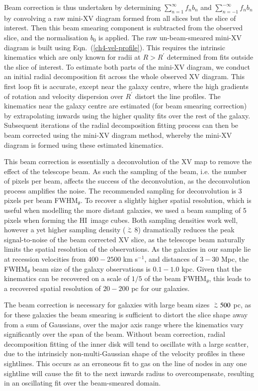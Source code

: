 \documentclass[traditabstract]{aa} %
\newcommand\gesim{\lower.5ex\hbox{$\; \buildrel > \over \sim \;$}}
\newcommand\HI{H{\small I}}
\newcommand\kms{km s$^{-1}$}
\begin{document}
Beam correction is thus undertaken by determining $\sum_{n=1}^{\infty}
f_n b_n$ and $\sum_{n=-1}^{-\infty} f_n b_n$ by convolving a raw
mini-XV diagram formed from all slices but the slice of interest. Then this
beam smearing component is subtracted from the observed slice, and the
normalisation $b_0$ is applied. The raw un-beam-smeared mini-XV diagram is
built using Eqn.~(\ref{ch4-vel-profile}). This requires the intrinsic
kinematics which are only known for radii at $R > R^{\prime}$
determined from fits outside the slice of interest. To estimate both
parts of the mini-XV diagram, we conduct an initial radial decomposition fit
across the whole observed XV diagram.  This first loop fit is 
accurate, except near
the galaxy centre, where the high gradients of rotation and velocity
dispersion over $R^{\prime}$ distort the line profiles. The kinematics
near the galaxy centre are estimated (for beam smearing correction) by
extrapolating inwards using the higher quality fits over the rest of the galaxy.
Subsequent iterations of the radial decomposition fitting process can
then be beam corrected using the mini-XV diagram method, whereby the mini-XV
 diagram is formed using these estimated kinematics. 

This beam correction is essentially a deconvolution of the XV map to
remove the effect of the telescope beam. As such the sampling of the
beam, i.e. the number of pixels per beam, affects the success of the
deconvolution, as the deconvolution process amplifies the noise. 
The recommended sampling
for deconvolution is 3 pixels per beam FWHM$_{\theta}$. To recover a slightly
higher spatial resolution, which is useful when modelling the more distant
galaxies, we used a beam sampling of 5 pixels when forming the \HI\
image cubes. Both sampling densities work well, however a yet higher
sampling density ($\gesim$8) dramatically reduces the peak
signal-to-noise of the beam corrected XV slice, as the telescope beam
naturally limits the spatial resolution of the observations. As the
galaxies in our sample lie at recession velocities from $400-2500$
\kms, and distances of $3-30$ Mpc, the FWHM$_{\theta}$ beam size of the galaxy
observations is $0.1-1.0$ kpc.  Given that the kinematics can be
recovered on a scale of $1/5$ of the beam FWHM$_{\theta}$, this leads to a
recovered spatial resolution of $20-200$ pc for our galaxies. 

The beam correction is necessary for galaxies with large beam sizes
$\gesim 500$ pc, as for these galaxies the beam smearing is
sufficient to distort the slice shape away from a sum of Gaussians,
over the major axis range where the kinematics vary significantly over
the span of the beam.  Without beam correction, radial
decomposition fitting of the inner disk will tend to oscillate 
with a large scatter, 
due to the intrinsicly non-multi-Gaussian shape of the velocity 
profiles in these 
sightlines. This occurs as an erroneous fit to gas on the line 
of nodes in any one 
sightline will cause the fit to the next inwards radius to 
overcompensate, resulting 
in an oscillating fit over the beam-smeared domain.
\end{document}
